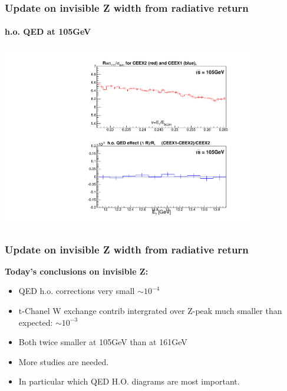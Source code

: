 \documentclass{beamer}
\begin{document}
\begin{frame}[fragile]
\frametitle{\bf Update on invisible Z width from radiative return}
\framesubtitle{\bf\large h.o. QED at 105GeV}

\includegraphics[width=110mm,height=80mm]{./cCeex21rat_E105.pdf}
\end{frame}


\begin{frame}[fragile]
\frametitle{\bf Update on invisible Z width from radiative return}

{\bf Today's conclusions on invisible Z:}
\begin{itemize}
\item 
 QED h.o. corrections very small $\sim 10^{-4}$
\item
 t-Chanel W exchange contrib intergrated over Z-peak
 much smaller than expected: $\sim 10^{-3}$
\item
 Both twice smaller at 105GeV than at 161GeV
\item
 More studies are needed.
\item
 In particular which QED H.O. diagrams are most important.
\end{itemize}
\end{frame}
\end{document}
